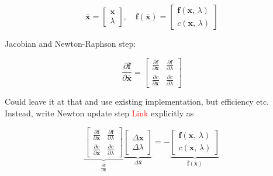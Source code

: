 \begin{equation}
\overline{\boldsymbol{x}} =
\begin{bmatrix}
\boldsymbol{x} \\
\lambda
\end{bmatrix},\quad
\overline{\boldsymbol{f}}(\overline{\boldsymbol{x}}) =
\begin{bmatrix}
\boldsymbol{f}(\boldsymbol{x},\,\lambda) \\
c(\boldsymbol{x},\,\lambda)
\end{bmatrix}
\end{equation}

Jacobian and Newton-Raphson step:

\begin{equation}
\renewcommand{\arraystretch}{1.5}
\frac{\partial\overline{\boldsymbol{f}}}{\partial\overline{\boldsymbol{x}}} =
\begin{bmatrix}
\frac{\partial\boldsymbol{f}}{\partial\boldsymbol{x}} & \frac{\partial\boldsymbol{f}}{\partial\lambda} \\
\frac{\partial c}{\partial \boldsymbol{x}} &  \frac{\partial c}{\partial \lambda}
\end{bmatrix}
\end{equation}

Could leave it at that and use existing implementation, but efficiency etc.
Instead, write Newton update step \textcolor{red}{Link} explicitly as

\begin{equation}
\renewcommand{\arraystretch}{1.5}
\underbrace{
\begin{bmatrix}
\frac{\partial\boldsymbol{f}}{\partial\boldsymbol{x}} & \frac{\partial\boldsymbol{f}}{\partial\lambda} \\
\frac{\partial c}{\partial \boldsymbol{x}} &  \frac{\partial c}{\partial \lambda}
\end{bmatrix}
}_{\frac{\partial\overline{\boldsymbol{f}}}{\partial\overline{\boldsymbol{x}}}}
\underbrace{
\begin{bmatrix}
\Delta\boldsymbol{x} \\
\Delta\lambda
\end{bmatrix}
}_{\Delta\overline{\boldsymbol{x}}}
=
-
\underbrace{
\begin{bmatrix}
\boldsymbol{f}(\boldsymbol{x},\,\lambda) \\
c(\boldsymbol{x},\,\lambda)
\end{bmatrix}
}_{\overline{\boldsymbol{f}}(\overline{\boldsymbol{x}})}
\end{equation}

